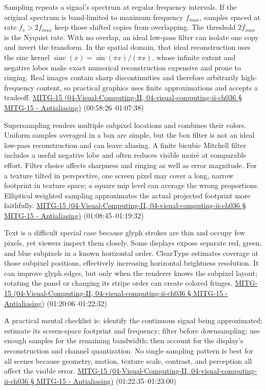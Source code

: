 Sampling repeats a signal's spectrum at regular frequency intervals. If the original spectrum is band-limited to maximum frequency \(f_{max}\), samples spaced at rate \(f_s>2f_{max}\) keep those shifted copies from overlapping. The threshold \(2f_{max}\) is the Nyquist rate. With no overlap, an ideal low-pass filter can isolate one copy and invert the transform. In the spatial domain, that ideal reconstruction uses the sinc kernel \(\operatorname{sinc}(x)=\sin(\pi x)/(\pi x)\), whose infinite extent and negative lobes make exact numerical reconstruction expensive and prone to ringing. Real images contain sharp discontinuities and therefore arbitrarily high-frequency content, so practical graphics uses finite approximations and accepts a tradeoff. \href{}{MITG-15 (04-Visual-Computing-II, 04-visual-computing-ii-ch036 § MITG-15 - Antialiasing)} (00:58:26--01:07:38)

Supersampling renders multiple subpixel locations and combines their colors. Uniform samples averaged in a box are simple, but the box filter is not an ideal low-pass reconstruction and can leave aliasing. A finite bicubic Mitchell filter includes a useful negative lobe and often reduces visible moiré at comparable effort. Filter choice affects sharpness and ringing as well as error magnitude. For a texture tilted in perspective, one screen pixel may cover a long, narrow footprint in texture space; a square mip level can average the wrong proportions. Elliptical weighted sampling approximates the actual projected footprint more faithfully. \href{}{MITG-15 (04-Visual-Computing-II, 04-visual-computing-ii-ch036 § MITG-15 - Antialiasing)} (01:08:45--01:19:32)

Text is a difficult special case because glyph strokes are thin and occupy few pixels, yet viewers inspect them closely. Some displays expose separate red, green, and blue subpixels in a known horizontal order. ClearType estimates coverage at those subpixel positions, effectively increasing horizontal brightness resolution. It can improve glyph edges, but only when the renderer knows the subpixel layout; rotating the panel or changing its stripe order can create colored fringes. \href{}{MITG-15 (04-Visual-Computing-II, 04-visual-computing-ii-ch036 § MITG-15 - Antialiasing)} (01:20:06--01:22:32)

A practical mental checklist is: identify the continuous signal being approximated; estimate its screen-space footprint and frequency; filter before downsampling; use enough samples for the remaining bandwidth; then account for the display's reconstruction and channel quantization. No single sampling pattern is best for all scenes because geometry, motion, texture scale, contrast, and perception all affect the visible error. \href{}{MITG-15 (04-Visual-Computing-II, 04-visual-computing-ii-ch036 § MITG-15 - Antialiasing)} (01:22:35--01:23:00)

